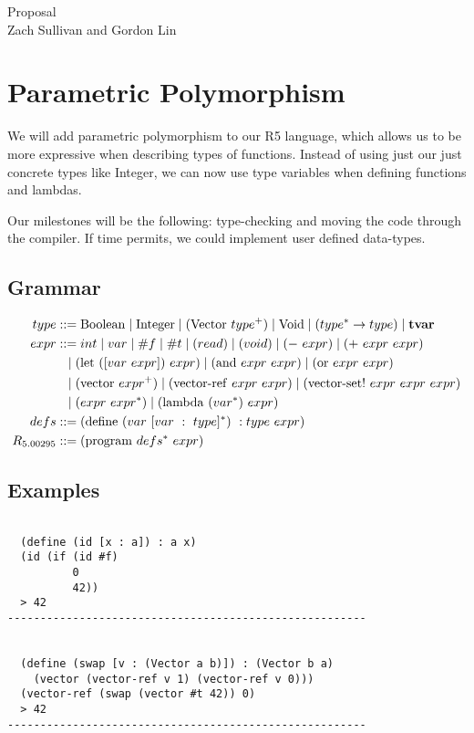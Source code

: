 \documentclass{article}
\begin{document}
\begin{center}
  {\huge Proposal}\\
  \vspace{0.1in}
  Zach Sullivan and Gordon Lin
  \vspace{0.2in}
\end{center}

\section*{Parametric Polymorphism}

We will add parametric polymorphism to our R5 language, which allows us to be
more expressive when describing types of functions. Instead of using just our
just concrete types like Integer, we can now use type variables when defining
functions and lambdas.

Our milestones will be the following: type-checking and moving the code through
the compiler. If time permits, we could implement user defined data-types.

\subsection*{Grammar}
\begin{align*}
  type &::= {\rm Boolean \mid Integer \mid (Vector}\ type^+) \mid
         {\rm Void} \mid (type^* \to type) \mid {\bf tvar}\\
  expr  &::= int \mid var \mid \#f \mid \#t \mid (read) \mid (void)
          \mid (-\ expr) \mid (+\ expr\ expr)\\
        &\ \ \mid({\rm let}\ ([var\ expr])\ expr) \mid ({\rm and}\ expr\ expr)
          \mid ({\rm or}\ expr\ expr)\\
        &\ \ \mid ({\rm vector}\ expr^+)
          \mid ({\rm vector\textrm{-}ref}\ expr\ expr)
          \mid ({\rm vector\textrm{-}set!}\ expr\ expr\ expr)\\
        &\ \ \mid (expr\ expr^*) \mid ({\rm lambda}\ (var^*)\ expr)\\
  defs  &::= ({\rm define}\ (var\ [var\ :\ type]^*)\ : type\ expr)\\
  R_{5.00295} &::= {\rm (program\ } defs^*\ expr)
\end{align*}


\subsection*{Examples}
\begin{verbatim}

  (define (id [x : a]) : a x)
  (id (if (id #f)
          0
          42))
  > 42
-------------------------------------------------------


  (define (swap [v : (Vector a b)]) : (Vector b a)
    (vector (vector-ref v 1) (vector-ref v 0)))
  (vector-ref (swap (vector #t 42)) 0)
  > 42
-------------------------------------------------------
\end{verbatim}
\end{document}
